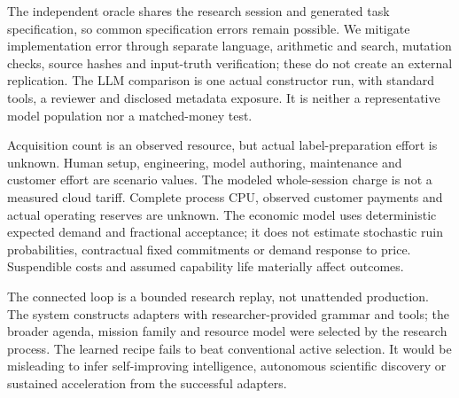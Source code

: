 \documentclass[11pt,letterpaper]{article}
\begin{document}
The independent oracle shares the research session and generated task specification, so common specification errors remain possible. We mitigate implementation error through separate language, arithmetic and search, mutation checks, source hashes and input-truth verification; these do not create an external replication. The LLM comparison is one actual constructor run, with standard tools, a reviewer and disclosed metadata exposure. It is neither a representative model population nor a matched-money test.

Acquisition count is an observed resource, but actual label-preparation effort is unknown. Human setup, engineering, model authoring, maintenance and customer effort are scenario values. The modeled whole-session charge is not a measured cloud tariff. Complete process CPU, observed customer payments and actual operating reserves are unknown. The economic model uses deterministic expected demand and fractional acceptance; it does not estimate stochastic ruin probabilities, contractual fixed commitments or demand response to price. Suspendible costs and assumed capability life materially affect outcomes.

The connected loop is a bounded research replay, not unattended production. The system constructs adapters with researcher-provided grammar and tools; the broader agenda, mission family and resource model were selected by the research process. The learned recipe fails to beat conventional active selection. It would be misleading to infer self-improving intelligence, autonomous scientific discovery or sustained acceleration from the successful adapters.
\end{document}
